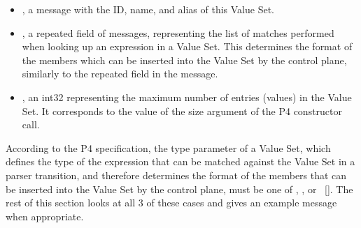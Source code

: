 \documentclass[11pt]{article}
\begin{document}
{\begin{itemize}
\item{}
, a  message with the ID, name, and alias of this Value
Set.%

\item{}
, a repeated field of  messages, representing the list of
matches performed when looking up an expression in a Value Set. This
determines the format of the members which can be inserted into the Value Set
by the control plane, similarly to the  repeated field in the
 message.%

\item{}
, an int32 representing the maximum number of entries (values) in the
Value Set. It corresponds to the value of the size argument of the P4
 constructor call.%
\end{itemize}%

\noindent{}According to the P4 specification, the type parameter of a Value Set, which
defines the type of the expression that can be matched against the Value Set in
a parser transition, and therefore determines the format of the members that can
be inserted into the Value Set by the control plane, must be one of ,
, or ~[]. The rest of this section looks at all 3 of
these cases and gives an example  message when appropriate.%

}
\end{document}
